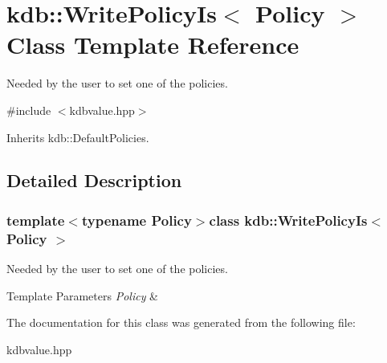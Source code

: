 \hypertarget{classkdb_1_1WritePolicyIs}{\section{kdb\+:\+:Write\+Policy\+Is$<$ Policy $>$ Class Template Reference}
\label{classkdb_1_1WritePolicyIs}
}


Needed by the user to set one of the policies.  




{\ttfamily \#include $<$kdbvalue.\+hpp$>$}



Inherits kdb\+::\+Default\+Policies.



\subsection{Detailed Description}
\subsubsection*{template$<$typename Policy$>$class kdb\+::\+Write\+Policy\+Is$<$ Policy $>$}

Needed by the user to set one of the policies. 


\begin{DoxyTemplParams}{Template Parameters}
{\em Policy} & \\
\hline
\end{DoxyTemplParams}


The documentation for this class was generated from the following file\+:\begin{DoxyCompactItemize}
\item 
kdbvalue.\+hpp\end{DoxyCompactItemize}
